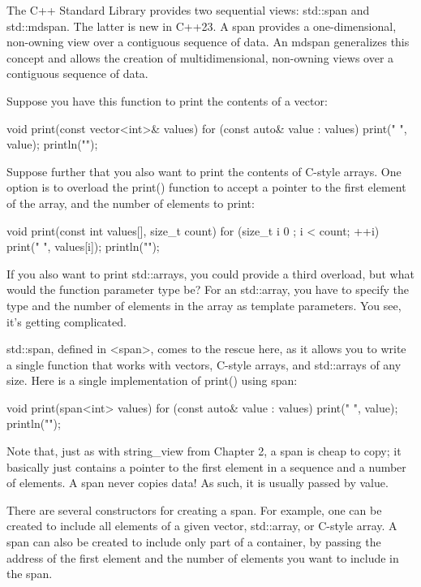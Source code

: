 
The C++ Standard Library provides two sequential views: std::span and std::mdspan. The latter is new in C++23. A span provides a one-dimensional, non-owning view over a contiguous sequence of data. An mdspan generalizes this concept and allows the creation of multidimensional, non-owning views over a contiguous sequence of data.


Suppose you have this function to print the contents of a vector:

\begin{cpp}
void print(const vector<int>& values)
{
    for (const auto& value : values) { print("{} ", value); }
    println("");
}
\end{cpp}

Suppose further that you also want to print the contents of C-style arrays. One option is to overload the print() function to accept a pointer to the first element of the array, and the number of elements to print:

\begin{cpp}
void print(const int values[], size_t count)
{
    for (size_t i { 0 }; i < count; ++i) { print("{} ", values[i]); }
    println("");
}
\end{cpp}

If you also want to print std::arrays, you could provide a third overload, but what would the function parameter type be? For an std::array, you have to specify the type and the number of elements in the array as template parameters. You see, it’s getting complicated.

std::span, defined in <span>, comes to the rescue here, as it allows you to write a single function that works with vectors, C-style arrays, and std::arrays of any size. Here is a single implementation of print() using span:

\begin{cpp}
void print(span<int> values)
{
    for (const auto& value : values) { print("{} ", value); }
    println("");
}
\end{cpp}

Note that, just as with string\_view from Chapter 2, a span is cheap to copy; it basically just contains a pointer to the first element in a sequence and a number of elements. A span never copies data! As such, it is usually passed by value.

There are several constructors for creating a span. For example, one can be created to include all elements of a given vector, std::array, or C-style array. A span can also be created to include only part of a container, by passing the address of the first element and the number of elements you want to include in the span.

